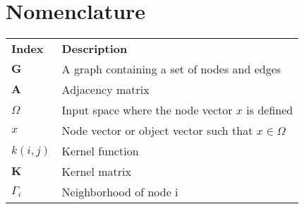 \chapter*{Nomenclature}

{\centering
\begin{longtabu}{X[2cm,l] X[8cm,p,l]}


\\
\textbf{Index} & \textbf{Description}\\
$\textbf{G}$ & A graph containing a set of nodes and edges\\
$\textbf{A}$ & Adjacency matrix\\
$\Omega$ & Input space where the node vector $x$ is defined\\
$x$ & Node vector or object vector such that $x \in \Omega$\\
$k(i,j)$ & Kernel function\\
$\textbf{K}$ & Kernel matrix\\
$\Gamma_i$ & Neighborhood of node i\\

\end{longtabu}}

